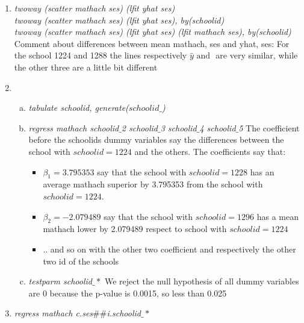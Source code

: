 \documentclass[10pt,a4paper]{article}
\begin{document}
\begin{enumerate}
	\item \textit{twoway (scatter mathach ses) (lfit yhat ses) \\
		twoway (scatter mathach ses) (lfit yhat ses), by(schoolid) \\
		twoway (scatter mathach ses) (lfit yhat ses) (lfit mathach ses), by(schoolid)
	} \\
	Comment about differences between  mean mathach, ses and yhat, ses:
	For the school 1224 and 1288 the lines respectively $ \hat{y} \text{ and } $ are very similar, while the other three are a little bit different
	\item 
	\begin{enumerate}[a)]
		\item \textit{tabulate schoolid, generate($ schoolid\_ $)}
		\item \textit{regress mathach schoolid$\_$2 schoolid$\_$3 schoolid$\_$4 schoolid$\_$5}
		The coefficient before the schoolids dummy variables say the differences between the school with $ schoolid = 1224 $ and the others. The coefficients say that:
		\begin{itemize}
			\item $ \beta_1 =  3.795353  $ say that the school with $ schoolid = 1228  $ has an average mathach superior by 3.795353 from the school with $ schoolid = 1224 $.
			\item $ \beta_2 =  -2.079489  $ say that  the school with $ schoolid =  1296 $ has a mean mathach lower by 2.079489 respect to school with $ schoolid = 1224 $
			\item .. and so on with the other two coefficient and respectively the other two id of the schools
		\end{itemize}
		\item \textit{testparm schoolid$\_* $} We reject the null hypothesis of all dummy variables are 0 because the p-value is 0.0015, so less than 0.025
	\end{enumerate}
	\item \textit{regress mathach c.ses$ \#\# $i.schoolid$ \_* $}
	\end{enumerate}


	

	
\end{document}
